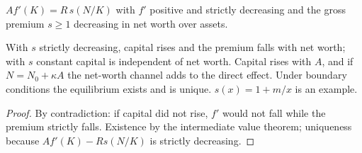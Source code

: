 \begin{definition}
\label{def:bgg_accel}
\leanok
$Af'(K)=R\,s(N/K)$ with $f'$ positive and strictly decreasing and the gross premium $s\ge1$ decreasing in net worth over assets.
\end{definition}

\begin{theorem}
\label{thm:bgg_accel}
\leanok
{}
With $s$ strictly decreasing, capital rises and the premium falls with net worth; with $s$ constant capital is independent of net
worth. Capital rises with $A$, and if $N=N_0+\kappa A$ the net-worth channel adds to the direct effect. Under boundary conditions
the equilibrium exists and is unique. $s(x)=1+m/x$ is an example.
\end{theorem}
\begin{proof}
\leanok
By contradiction: if capital did not rise, $f'$ would not fall while the premium strictly falls. Existence by the intermediate
value theorem; uniqueness because $Af'(K)-Rs(N/K)$ is strictly decreasing.
\end{proof}
